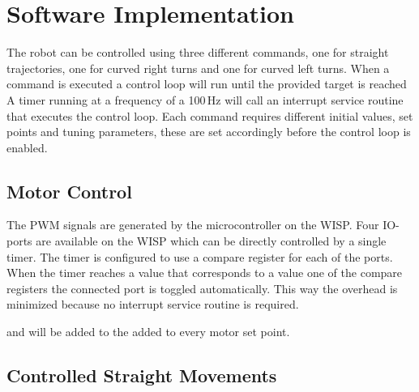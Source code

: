 


\section{Software Implementation}
\label{sec:dai_software_implementation}

The robot can be controlled using three different commands, one for straight trajectories, one for curved right turns and one for curved left turns.
When a command is executed a control loop will run until the provided target is reached
A timer running at a frequency of a 100\,Hz will call an interrupt service routine that executes the control loop.   
Each command requires different initial values, set points and tuning parameters, these are set accordingly before the control loop is enabled.


\subsection{Motor Control}
The PWM signals are generated by the microcontroller on the WISP.
Four IO-ports are available on the WISP which can be directly controlled by a single timer.
The timer is configured to use a compare register for each of the ports.
When the timer reaches a value that corresponds to a value one of the compare registers the connected port is toggled automatically.
This way the overhead is minimized because no interrupt service routine is required.

and will be added to the added to every motor set point.

\subsection{Controlled Straight Movements}

